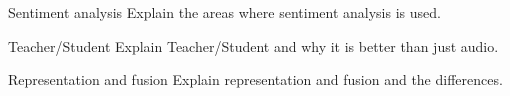 \documentclass{article}
\begin{document}
\begin{exercise}{Sentiment analysis}
  Explain the areas where sentiment analysis is used.

  \begin{solution}
  \end{solution}
\end{exercise}

\begin{exercise}{Teacher/Student}
  Explain Teacher/Student and why it is better than just audio.

  \begin{solution}
  \end{solution}
\end{exercise}

\begin{exercise}{Representation and fusion}
  Explain representation and fusion and the differences.

  \begin{solution}
  \end{solution}
\end{exercise}
\end{document}
